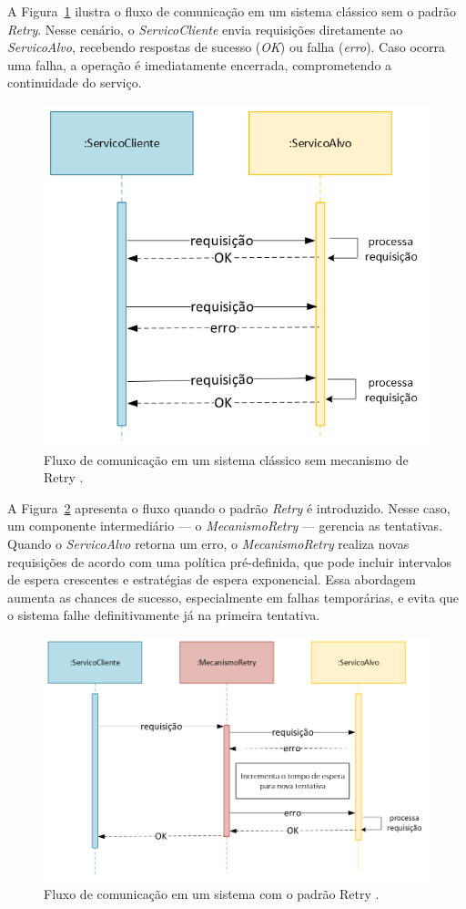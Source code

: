 A Figura~\ref{fig:classical-client-target-diagram} ilustra o fluxo de comunicação em um sistema clássico sem o padrão \textit{Retry}. Nesse cenário, o \textit{ServicoCliente} envia requisições diretamente ao \textit{ServicoAlvo}, recebendo respostas de sucesso (\textit{OK}) ou falha (\textit{erro}). Caso ocorra uma falha, a operação é imediatamente encerrada, comprometendo a continuidade do serviço.

\begin{figure}[H]
\centering
\includegraphics[width=0.6\linewidth]{imagens/classical-client-target-diagram.png}
\caption{Fluxo de comunicação em um sistema clássico sem mecanismo de Retry \citep{inproceedings}.}
\label{fig:classical-client-target-diagram}
\end{figure}

A Figura~\ref{fig:retry-pattern-diagram} apresenta o fluxo quando o padrão \textit{Retry} é introduzido. Nesse caso, um componente intermediário — o \textit{MecanismoRetry} — gerencia as tentativas. Quando o \textit{ServicoAlvo} retorna um erro, o \textit{MecanismoRetry} realiza novas requisições de acordo com uma política pré-definida, que pode incluir intervalos de espera crescentes e estratégias de espera exponencial. Essa abordagem aumenta as chances de sucesso, especialmente em falhas temporárias, e evita que o sistema falhe definitivamente já na primeira tentativa.

\begin{figure}[H]
\centering
\includegraphics[width=0.7\linewidth]{imagens/retry-pattern-diagram.png}
\caption{Fluxo de comunicação em um sistema com o padrão Retry \citep{inproceedings}.}
\label{fig:retry-pattern-diagram}
\end{figure}

